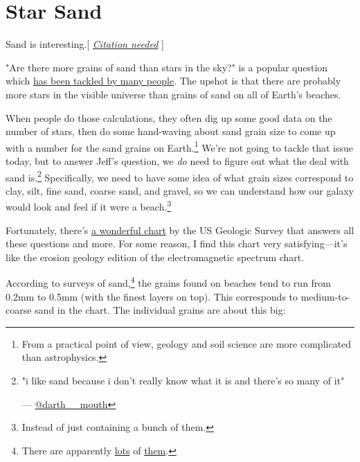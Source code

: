 {{
\chapter{Star Sand}
}

\hfill{}

{Sand is interesting.[ \emph{ \href{}{Citation needed}} ]}

{"Are there more grains of sand than stars in the sky?" is a popular question which \href{https://www.google.com/search?q=sand+grains+or+stars}{has been tackled by many people}. The upshot is that there are probably more stars in the visible universe than grains of sand on all of Earth's beaches.}

{When people do those calculations, they often dig up some good data on the number of stars, then do some hand-waving about sand grain size to come up with a number for the sand grains on Earth.{\footnote{From a practical point of view, geology and soil science are more complicated than astrophysics.} } We're not going to tackle that issue today, but to answer Jeff's question, we \emph{do} need to figure out what the deal with sand is.{\footnote{"i like sand because i don't really know what it is and there's so many of it"

— \href{https://twitter.com/darth\_\_mouth/status/200707234840313856}{@darth\_\_mouth}} } Specifically, we need to have some idea of what grain sizes correspond to clay, silt, fine sand, coarse sand, and gravel, so we can understand how our galaxy would look and feel if it were a beach.{\footnote{Instead of just containing a bunch of them.} } }

{Fortunately, there's \href{http://pubs.usgs.gov/of/2003/of03-001/htmldocs/images/chart.pdf}{a wonderful chart} by the US Geologic Survey that answers all these questions and more. For some reason, I find this chart very satisfying—it's like the erosion geology edition of the electromagnetic spectrum chart.}

{According to surveys of sand,{\footnote{There are apparently \href{http://www.fsbpa.com/05Proceedings/02-Don\%20Stauble.pdf}{lots} of \href{http://www.vliz.be/imisdocs/publications/37337.pdf} {them}.} } the grains found on beaches tend to run from 0.2mm to 0.5mm (with the finest layers on top). This corresponds to medium-to-coarse sand in the chart. The individual grains are about this big:}

}
